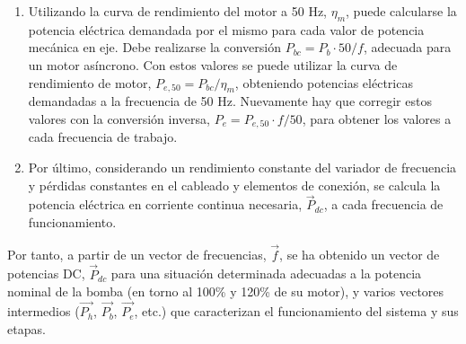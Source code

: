 \begin{enumerate}
\item Utilizando la curva de rendimiento del motor a 50 Hz, $\eta_{m}$,
puede calcularse la potencia eléctrica demandada por el mismo para
cada valor de potencia mecánica en eje. Debe realizarse la conversión
$P_{bc}=P_{b}\cdot50/f$, adecuada para un motor asíncrono. Con estos
valores se puede utilizar la curva de rendimiento de motor, $P_{e,50}=P_{bc}/\eta_{m}$,
obteniendo potencias eléctricas demandadas a la frecuencia de 50 Hz.
Nuevamente hay que corregir estos valores con la conversión inversa,
$P_{e}=P_{e,50}\cdot f/50$, para obtener los valores a cada frecuencia
de trabajo.
\item Por último, considerando un rendimiento constante del variador de
frecuencia y pérdidas constantes en el cableado y elementos de conexión,
se calcula la potencia eléctrica en corriente continua necesaria,
$\vec{P}_{dc}$, a cada frecuencia de funcionamiento.
\end{enumerate}
Por tanto, a partir de un vector de frecuencias, $\vec{f}$, se ha
obtenido un vector de potencias DC, $\vec{P}_{dc}$ para una situación
determinada adecuadas a la potencia nominal de la bomba (en torno
al 100\% y 120\% de su motor), y varios vectores intermedios ($\vec{P_{h}}$,
$\vec{P_{b}}$, $\vec{P_{e}}$, etc.) que caracterizan el funcionamiento
del sistema y sus etapas. 

